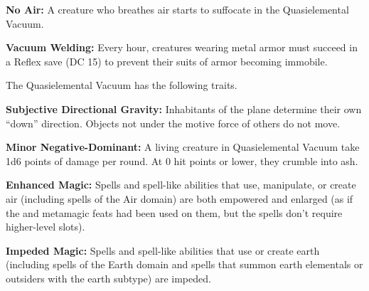\textbf{No Air:} A creature who breathes air starts to suffocate in the Quasielemental Vacuum.

\textbf{Vacuum Welding:} Every hour, creatures wearing metal armor must succeed in a Reflex save (DC 15) to prevent their suits of armor becoming immobile.

The Quasielemental Vacuum has the following traits.
\begin{itemize*}
\item \textbf{Subjective Directional Gravity:} Inhabitants of the plane determine their own ``down'' direction. Objects not under the motive force of others do not move.
\item \textbf{Minor Negative-Dominant:} A living creature in Quasielemental Vacuum take 1d6 points of damage per round. At 0 hit points or lower, they crumble into ash.
\item \textbf{Enhanced Magic:} Spells and spell-like abilities that use, manipulate, or create air (including spells of the Air domain) are both empowered and enlarged (as if the  and  metamagic feats had been used on them, but the spells don't require higher-level slots).
\item \textbf{Impeded Magic:} Spells and spell-like abilities that use or create earth (including spells of the Earth domain and spells that summon earth elementals or outsiders with the earth subtype) are impeded.
\end{itemize*}
